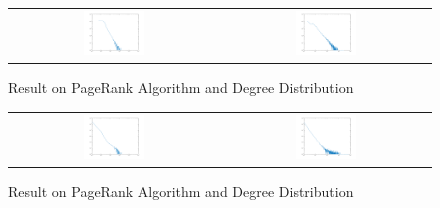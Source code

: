 \begin{figure}[H]
\begin{center}
\begin{tabular}{cc}
     \includegraphics[width=0.3\textwidth]{FIG/7pagerank.png} &
     \includegraphics[width=0.3\textwidth]{FIG/7degreedist.png} \\
\end{tabular}
\caption{Result on PageRank Algorithm and Degree Distribution}
\end{center}
\end{figure}

\begin{figure}[H]
\begin{center}
\begin{tabular}{cc}
     \includegraphics[width=0.3\textwidth]{FIG/8pagerank.png} &
     \includegraphics[width=0.3\textwidth]{FIG/8degreedist.png} \\
\end{tabular}
\caption{Result on PageRank Algorithm and Degree Distribution}
\end{center}
\end{figure}


